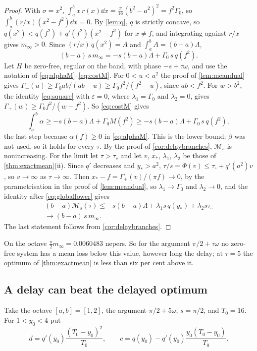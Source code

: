 \begin{proof}
With $\sigma=x^2$, $\int_a^bx\,r(x)\dd x=\frac\pi{16}(b^2-a^2)^2=f^2\Gamma_0$, so
$\int_a^b(r/x)(x^2-f^2)\dd x=0$. By \cref{lem:q}, $q$ is strictly concave, so
$q(x^2)<q(f^2)+q'(f^2)(x^2-f^2)$ for $x\ne f$, and integrating against $r/x$
gives $m_\infty>0$. Since $(r/x)\,q(x^2)=A$ and $\int_a^bA=(b-a)\Lambda$,
\[
(b-a)\,s\,m_\infty=-s(b-a)\Lambda+\Gamma_0\,s\,q(f^2).
\]
Let $H$ be zero-free, regular on the band, with phase $-s+\tau\omega$, and use
the notation of \eqref{eq:alphaM}--\eqref{eq:costM}. For $0<u<a^2$ the proof
of \cref{lem:meandual} gives $\Gamma_-(u)\ge\Gamma_0ab/(ab-u)\ge\Gamma_0f^2/(f^2-u)$,
since $ab<f^2$. For $w>b^2$, the identity \eqref{eq:square} with
$\varepsilon=0$, where $\lambda_1=\Gamma_0$ and $\lambda_2=0$, gives
$\Gamma_+(w)\ge\Gamma_0f^2/(w-f^2)$. So \eqref{eq:costM} gives
\[
\int_a^b\alpha\ge-s(b-a)\Lambda+\Gamma_0M(f^2)\ge-s(b-a)\Lambda+\Gamma_0\,s\,q(f^2),
\]
the last step because $\alpha(f)\ge0$ in \eqref{eq:alphaM}. This is the lower
bound; $\beta$ was not used, so it holds for every $\tau$. By the proof of
\cref{cor:delaybranches}, $\mathcal M_s$ is nonincreasing. For the limit let
$\tau>\tau_c$ and let $v$, $x_*$, $\lambda_1$, $\lambda_2$ be those of
\cref{thm:exactmean}(ii). Since $q'$ decreases and $y_*>a^2$,
$\tau/s=\Phi(v)\le\tau_\circ+q'(a^2)v$, so $v\to\infty$ as $\tau\to\infty$.
Then $x_*-f=\Gamma_+(v)/(\pi f)\to0$, by the parametrisation in the proof of
\cref{lem:meandual}, so $\lambda_1\to\Gamma_0$ and $\lambda_2\to0$, and the
identity after \eqref{eq:globallower} gives
\begin{multline*}
(b-a)\mathcal M_s(\tau)\le-s(b-a)\Lambda+\lambda_1s\,q(y_*)+\lambda_2s\tau_\circ\\
\to(b-a)\,s\,m_\infty .
\end{multline*}
The last statement follows from \cref{cor:delaybranches}.
\end{proof}

On the octave $\frac\pi2m_\infty=0.0060483$ nepers. So for the argument
$\pi/2+\tau\omega$ no zero-free system has a mean loss below this value, however
long the delay; at $\tau=5$ the optimum of \cref{thm:exactmean} is less than six per
cent above it.

\subsection{A delay can beat the delayed optimum}\label{ssec:delay}

Take the octave $[a,b]=[1,2]$, the argument $\pi/2+5\omega$, $s=\pi/2$, and
$T_0=16$. For $1<y_0<4$ put
\[
d=q'(y_0)\frac{(T_0-y_0)^2}{T_0},\qquad
c=q(y_0)-q'(y_0)\frac{y_0(T_0-y_0)}{T_0} .
\]

